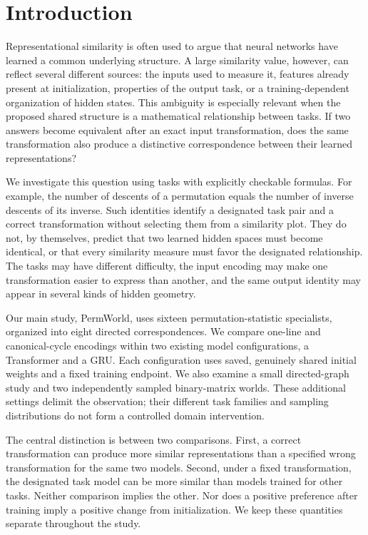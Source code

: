 \documentclass[10pt]{article}
\begin{document}
\section{Introduction}
Representational similarity is often used to argue that neural networks have
learned a common underlying structure. A large similarity value, however,
can reflect several different sources: the inputs used to measure it,
features already present at initialization, properties of the output task,
or a training-dependent organization of hidden states. This ambiguity is
especially relevant when the proposed shared structure is a mathematical
relationship between tasks. If two answers become equivalent after an exact
input transformation, does the same transformation also produce a
distinctive correspondence between their learned representations?

We investigate this question using tasks with explicitly checkable formulas.
For example, the number of descents of a permutation equals the number of
inverse descents of its inverse. Such identities identify a designated task
pair and a correct transformation without selecting them from a similarity
plot. They do not, by themselves, predict that two learned hidden spaces
must become identical, or that every similarity measure must favor the
designated relationship. The tasks may have different difficulty, the input
encoding may make one transformation easier to express than another, and the
same output identity may appear in several kinds of hidden geometry.

Our main study, PermWorld, uses sixteen permutation-statistic specialists,
organized into eight directed correspondences. We compare one-line and
canonical-cycle encodings within two existing model configurations, a
Transformer and a GRU. Each configuration uses saved, genuinely shared
initial weights and a fixed training endpoint. We also examine a small
directed-graph study and two independently sampled binary-matrix worlds.
These additional settings delimit the observation; their different task
families and sampling distributions do not form a controlled domain
intervention.

The central distinction is between two comparisons. First, a correct
transformation can produce more similar representations than a specified
wrong transformation for the same two models. Second, under a fixed
transformation, the designated task model can be more similar than models
trained for other tasks. Neither comparison implies the other. Nor does a
positive preference after training imply a positive change from
initialization. We keep these quantities separate throughout the study.
\end{document}

